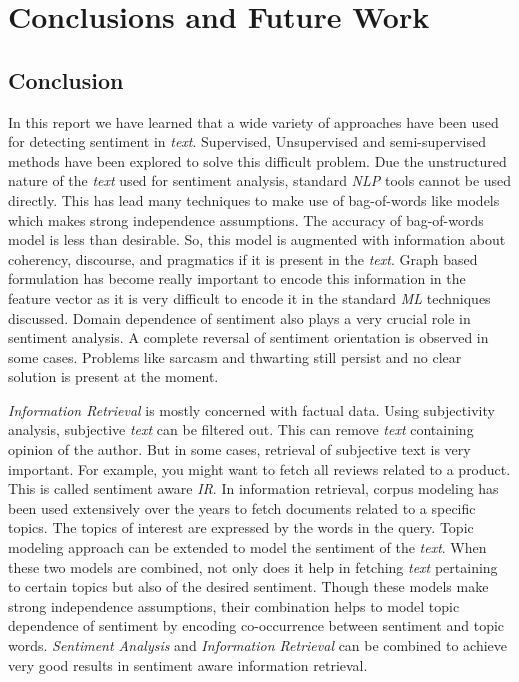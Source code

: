 
\chapter{Conclusions and Future Work} %

\label{Chapter6} %



\section{Conclusion}

In this report we have learned that a wide variety of approaches have been used for detecting sentiment in \textit{text}. Supervised, Unsupervised 
and semi-supervised methods have been explored to solve this difficult problem. Due the unstructured nature of the \textit{text} used for
sentiment analysis, standard \textit{NLP} tools cannot be used directly. This has lead many techniques to make use of bag-of-words like models which 
makes strong independence assumptions. The accuracy of bag-of-words model is less than desirable. So, this model is augmented with information
about coherency, discourse, and pragmatics if it is present in the \textit{text}. Graph based formulation has become really important to encode 
this information in the feature vector as it is very difficult to encode it in the standard \textit{ML} techniques discussed. Domain dependence of sentiment
also plays a very crucial role in sentiment analysis. A complete reversal of sentiment orientation is observed in some cases. Problems like 
sarcasm and thwarting still persist and no clear solution is present at the moment. 

\textit{Information Retrieval} is mostly concerned with factual data. Using subjectivity analysis, subjective \textit{text} can be filtered out. This
can remove \textit{text} containing opinion of the author. But in some cases, retrieval of subjective text is very important. For example, you might want to fetch
all reviews related to a product. This is called sentiment aware \textit{IR}. In information retrieval, corpus modeling has been used extensively over the years to fetch
documents related to a specific topics. The topics of interest are expressed by the words in the query. Topic modeling approach can be extended
to model the sentiment of the \textit{text}. When these two models are combined, not only does it help in fetching \textit{text} pertaining 
to certain topics but also of the desired sentiment. Though these models make strong independence assumptions, their combination helps to 
model topic dependence of sentiment by encoding co-occurrence between sentiment and topic words. \textit{Sentiment Analysis} and \textit{Information Retrieval}
can be combined to achieve very good results in sentiment aware information retrieval.

